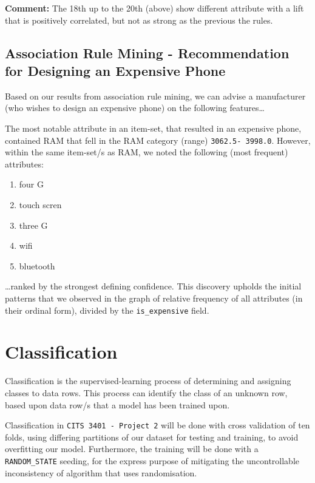 \documentclass[11pt]{article}
\providecommand{\tightlist}{%
      \setlength{\itemsep}{0pt}\setlength{\parskip}{0pt}}
\begin{document}
    \textbf{Comment:} The 18th up to the 20th (above) show different
attribute with a lift that is positively correlated, but not as strong
as the previous the rules.

    \hypertarget{association-rule-mining---recommendation-for-designing-an-expensive-phone}{%
\subsection{Association Rule Mining - Recommendation for Designing an
Expensive
Phone}\label{association-rule-mining---recommendation-for-designing-an-expensive-phone}}

Based on our results from association rule mining, we can advise a
manufacturer (who wishes to design an expensive phone) on the following
features\ldots{}

The most notable attribute in an item-set, that resulted in an expensive
phone, contained RAM that fell in the RAM category (range)
\texttt{3062.5-\ 3998.0}. However, within the same item-set/s as RAM, we
noted the following (most frequent) attributes:

\begin{enumerate}
\def\labelenumi{\arabic{enumi}.}
\tightlist
\item
  four G
\item
  touch scren
\item
  three G
\item
  wifi
\item
  bluetooth
\end{enumerate}

\ldots ranked by the strongest defining confidence. This discovery
upholds the initial patterns that we observed in the graph of relative
frequency of all attributes (in their ordinal form), divided by the
\texttt{is\_expensive} field.

    \hypertarget{classification}{%
\section{Classification}\label{classification}}

Classification is the supervised-learning process of determining and
assigning classes to data rows. This process can identify the class of
an unknown row, based upon data row/s that a model has been trained
upon.

Classification in \texttt{CITS\ 3401\ -\ Project\ 2} will be done with
cross validation of ten folds, using differing partitions of our dataset
for testing and training, to avoid overfitting our model. Furthermore,
the training will be done with a \texttt{RANDOM\_STATE} seeding, for the
express purpose of mitigating the uncontrollable inconsistency of
algorithm that uses randomisation.
\end{document}
